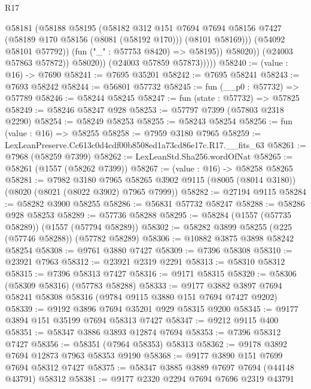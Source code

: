 \begin{lexlean}{R17}
\begin{coremodule}
                        @58181
                          (@58188
                            @58195
                            (@58182
                              @312
                              @151
                              @7694
                              @7694
                              @58156
                              @7427
                              (@58189 @170 @58156 (@8081 (@58192 @170)))
                              (@8101 @58169)))
                          (@54092 @58101 @57792))
                        (fun ("_" : @57753 @8420) => @58195))
                      @58020))
                  (@24003 @57863 @57872))
                @58020))
            (@24003 @57859 @57873)))))
@58240 := (value : @16) -> @7690
@58241 := @7695 @35201
@58242 := @7695 @58241
@58243 := @7693 @58242
@58244 := @56801 @57732
@58245 := fun (__p0 : @57732) => @57789
@58246 := @58244 @58245
@58247 := fun (state : @57732) => @57825
@58249 := @58246 @58247 @928
@58253 := @57797 @7399 (@57803 @2318 @2290)
@58254 := @58249 @58253
@58255 := @58243 @58254
@58256 := fun (value : @16) => @58255
@58258 := @7959 @3180 @7965
@58259 := LexLeanPreserve.Cc613c0d4cdf00b8508ed1a73cd86e17c.R17.__fits_63
@58261 := @7968 (@58259 @7399)
@58262 := LexLeanStd.Sha256.wordOfNat
@58265 := @58261 (@1557 (@58262 @7399))
@58267 := (value : @16) -> @58258 @58265
@58281 := @7982
    @3180
    @7965
    @58265
    @3902
    @9115
    (@8005 (@8014 @3180))
    (@8020 (@8021 (@8022 @3902) @7965 @7999))
@58282 := @27194 @9115
@58284 := @58282 @3900 @58255
@58286 := @56831 @57732 @58247
@58288 := @58286 @928 @58253
@58289 := @57736 @58288
@58295 := @58284 (@1557 (@57735 @58289)) (@1557 (@57794 @58289))
@58302 := @58282 @3899 @58255 (@225 (@57746 @58288)) (@57782 @58289)
@58306 := @10882 @3875 @3898 @58242 @58254
@58308 := @9761 @3880 @7427
@58309 := @7396 @58308
@58310 := @23921 @7963
@58312 := @23921 @2319 @2291
@58313 := @58310 @58312
@58315 := @7396 @58313 @7427
@58316 := @9171 @58315
@58320 := @58306 (@58309 @58316) (@57783 @58288)
@58333 := @9177 @3882 @3897 @7694 @58241 @58308 @58316 (@9784 @9115 @3880 @151 @7694 @7427 @9202)
@58339 := @9192 @3896 @7694 @35201 @929 @58315 @9200
@58345 := @9177 @3894 @151 @35199 @7694 @58313 @7427
@58347 := @9212 @9115 @400
@58351 := @58347 @3886 @3893 @12874 @7694
@58353 := @7396 @58312 @7427
@58356 := @58351 (@7964 @58353) @58313
@58362 := @9178 @3892 @7694 @12873 @7963 @58353 @9190
@58368 := @9177 @3890 @151 @7699 @7694 @58312 @7427
@58375 := @58347 @3885 @3889 @7697 @7694 (@44148 @43791) @58312
@58381 := @9177 @2320 @2294 @7694 @7696 @2319 @43791

\end{coremodule}
\end{lexlean}
